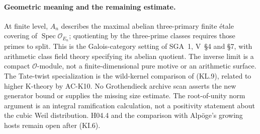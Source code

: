 \paragraph{Geometric meaning and the remaining estimate.}
At finite level, $A_n$ describes the maximal abelian
three-primary finite \'etale covering of
$\operatorname{Spec}\mathcal O_{E_n}$; quotienting by the
three-prime classes requires those primes to split.
This is the Galois-category setting of SGA~1, V~\S4 and
\S7, with arithmetic class field theory specifying its
abelian quotient.  The inverse limit is a compact
$\mathcal O$-module, not a finite-dimensional pure motive
or an arithmetic surface.  The Tate-twist specialization
is the wild-kernel comparison of (KL.9), related to higher
K-theory by AC-K10.  No Grothendieck archive scan asserts
the new generator bound or supplies the missing size estimate.
The root-of-unity norm argument is an integral ramification
calculation, not a positivity statement about the cubic
Weil distribution.  H04.4 and the comparison with Alp\"oge's
growing hosts remain open after (KI.6).
